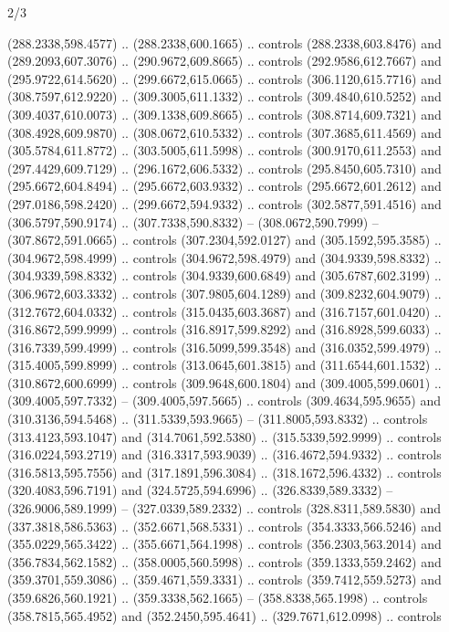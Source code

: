 \begin{flagdescription}{2/3}
\begin{scope}[xshift=0.5\flaglength,yshift=0.5\flagwidth,scale=\flagwidth/525.28]
\begin{scope}[y=0.1mm, x=0.1mm, yscale=-1,shift={(-381.5,-404)}]
\begin{scope}[shift={(5.25001,4.53053)},miter limit=4.00,line width=0.800\lw]
  (288.2338,598.4577) .. (288.2338,600.1665) .. controls (288.2338,603.8476) and
  (289.2093,607.3076) .. (290.9672,609.8665) .. controls (292.9586,612.7667) and
  (295.9722,614.5620) .. (299.6672,615.0665) .. controls (306.1120,615.7716) and
  (308.7597,612.9220) .. (309.3005,611.1332) .. controls (309.4840,610.5252) and
  (309.4037,610.0073) .. (309.1338,609.8665) .. controls (308.8714,609.7321) and
  (308.4928,609.9870) .. (308.0672,610.5332) .. controls (307.3685,611.4569) and
  (305.5784,611.8772) .. (303.5005,611.5998) .. controls (300.9170,611.2553) and
  (297.4429,609.7129) .. (296.1672,606.5332) .. controls (295.8450,605.7310) and
  (295.6672,604.8494) .. (295.6672,603.9332) .. controls (295.6672,601.2612) and
  (297.0186,598.2420) .. (299.6672,594.9332) .. controls (302.5877,591.4516) and
  (306.5797,590.9174) .. (307.7338,590.8332) -- (308.0672,590.7999) --
  (307.8672,591.0665) .. controls (307.2304,592.0127) and (305.1592,595.3585) ..
  (304.9672,598.4999) .. controls (304.9672,598.4979) and (304.9339,598.8332) ..
  (304.9339,598.8332) .. controls (304.9339,600.6849) and (305.6787,602.3199) ..
  (306.9672,603.3332) .. controls (307.9805,604.1289) and (309.8232,604.9079) ..
  (312.7672,604.0332) .. controls (315.0435,603.3687) and (316.7157,601.0420) ..
  (316.8672,599.9999) .. controls (316.8917,599.8292) and (316.8928,599.6033) ..
  (316.7339,599.4999) .. controls (316.5099,599.3548) and (316.0352,599.4979) ..
  (315.4005,599.8999) .. controls (313.0645,601.3815) and (311.6544,601.1532) ..
  (310.8672,600.6999) .. controls (309.9648,600.1804) and (309.4005,599.0601) ..
  (309.4005,597.7332) -- (309.4005,597.5665) .. controls (309.4634,595.9655) and
  (310.3136,594.5468) .. (311.5339,593.9665) -- (311.8005,593.8332) .. controls
  (313.4123,593.1047) and (314.7061,592.5380) .. (315.5339,592.9999) .. controls
  (316.0224,593.2719) and (316.3317,593.9039) .. (316.4672,594.9332) .. controls
  (316.5813,595.7556) and (317.1891,596.3084) .. (318.1672,596.4332) .. controls
  (320.4083,596.7191) and (324.5725,594.6996) .. (326.8339,589.3332) --
  (326.9006,589.1999) -- (327.0339,589.2332) .. controls (328.8311,589.5830) and
  (337.3818,586.5363) .. (352.6671,568.5331) .. controls (354.3333,566.5246) and
  (355.0229,565.3422) .. (355.6671,564.1998) .. controls (356.2303,563.2014) and
  (356.7834,562.1582) .. (358.0005,560.5998) .. controls (359.1333,559.2462) and
  (359.3701,559.3086) .. (359.4671,559.3331) .. controls (359.7412,559.5273) and
  (359.6826,560.1921) .. (359.3338,562.1665) -- (358.8338,565.1998) .. controls
  (358.7815,565.4952) and (352.2450,595.4641) .. (329.7671,612.0998) .. controls

\end{scope}
\end{scope}
\end{scope}
\end{flagdescription}
